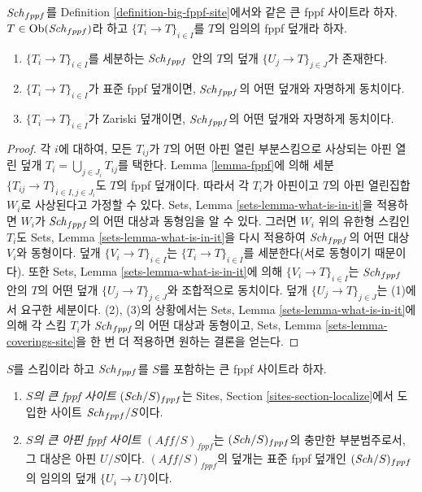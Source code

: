 \begin{lemma}
\label{lemma-fppf-induced}
$\mathit{Sch}_{fppf}$를 Definition \ref{definition-big-fppf-site}에서와 같은 큰
fppf 사이트라 하자. $T \in \mathop{\mathrm{Ob}}\nolimits(\mathit{Sch}_{fppf})$라 하고
$\{T_i \to T\}_{i \in I}$를 $T$의 임의의 fppf 덮개라 하자.
\begin{enumerate}
\item $\{T_i \to T\}_{i \in I}$를 세분하는 $\mathit{Sch}_{fppf}$ 안의 $T$의
덮개 $\{U_j \to T\}_{j \in J}$가 존재한다.
\item $\{T_i \to T\}_{i \in I}$가 표준 fppf 덮개이면,
$\mathit{Sch}_{fppf}$의 어떤 덮개와 자명하게 동치이다.
\item $\{T_i \to T\}_{i \in I}$가 Zariski 덮개이면,
$\mathit{Sch}_{fppf}$의 어떤 덮개와 자명하게 동치이다.
\end{enumerate}
\end{lemma}

\begin{proof}
각 $i$에 대하여, 모든 $T_{ij}$가 $T$의 어떤 아핀 열린 부분스킴으로
사상되는 아핀 열린 덮개
$T_i = \bigcup_{j \in J_i} T_{ij}$를 택한다. Lemma \ref{lemma-fppf}에
의해 세분 $\{T_{ij} \to T\}_{i \in I, j \in J_i}$도 $T$의 fppf
덮개이다. 따라서 각 $T_i$가 아핀이고 $T$의 아핀 열린집합 $W_i$로
사상된다고 가정할 수 있다. Sets, Lemma
\ref{sets-lemma-what-is-in-it}을 적용하면 $W_i$가 $\mathit{Sch}_{fppf}$의 어떤
대상과 동형임을 알 수 있다. 그러면 $W_i$ 위의 유한형 스킴인 $T_i$도
Sets, Lemma \ref{sets-lemma-what-is-in-it}을 다시 적용하여
$\mathit{Sch}_{fppf}$의 어떤 대상 $V_i$와 동형이다. 덮개
$\{V_i \to T\}_{i \in I}$는 $\{T_i \to T\}_{i \in I}$를 세분한다(서로
동형이기 때문이다). 또한 Sets, Lemma
\ref{sets-lemma-what-is-in-it}에 의해 $\{V_i \to T\}_{i \in I}$는
$\mathit{Sch}_{fppf}$ 안의 $T$의 어떤 덮개 $\{U_j \to T\}_{j \in J}$와
조합적으로 동치이다. 덮개 $\{U_j \to T\}_{j \in J}$는 (1)에서
요구한 세분이다. (2), (3)의 상황에서는 Sets, Lemma
\ref{sets-lemma-what-is-in-it}에 의해 각 스킴 $T_i$가 $\mathit{Sch}_{fppf}$의
어떤 대상과 동형이고, Sets, Lemma \ref{sets-lemma-coverings-site}을 한
번 더 적용하면 원하는 결론을 얻는다.
\end{proof}

\begin{definition}
\label{definition-big-small-fppf}
$S$를 스킴이라 하고 $\mathit{Sch}_{fppf}$를 $S$를 포함하는 큰 fppf 사이트라
하자.
\begin{enumerate}
\item {\it $S$의 큰 fppf 사이트} $(\mathit{Sch}/S)_{fppf}$는 Sites, Section
\ref{sites-section-localize}에서 도입한 사이트 $\mathit{Sch}_{fppf}/S$이다.
\item {\it $S$의 큰 아핀 fppf 사이트} $(\textit{Aff}/S)_{fppf}$는
$(\mathit{Sch}/S)_{fppf}$의 충만한 부분범주로서, 그 대상은 아핀 $U/S$이다.
$(\textit{Aff}/S)_{fppf}$의 덮개는 표준 fppf 덮개인
$(\mathit{Sch}/S)_{fppf}$의 임의의 덮개 $\{U_i \to U\}$이다.
\end{enumerate}
\end{definition}

